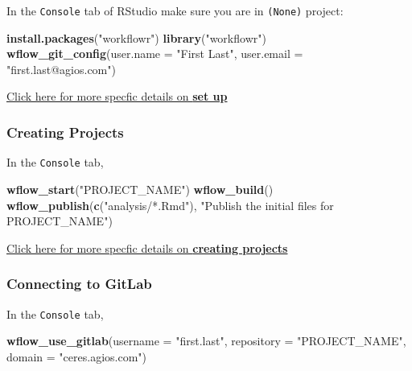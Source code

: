 \documentclass[openany]{book}
\newenvironment{Shaded}{\begin{snugshade}}{\end{snugshade}}
\newcommand{\DataTypeTok}[1]{\textcolor[rgb]{0.13,0.29,0.53}{#1}}
\newcommand{\KeywordTok}[1]{\textcolor[rgb]{0.13,0.29,0.53}{\textbf{#1}}}
\newcommand{\NormalTok}[1]{#1}
\newcommand{\StringTok}[1]{\textcolor[rgb]{0.31,0.60,0.02}{#1}}
\begin{document}
In the \texttt{Console} tab of RStudio make sure you are in \texttt{(None)} project:

\begin{Shaded}
\begin{Highlighting}[]
\KeywordTok{install.packages}\NormalTok{(}\StringTok{"workflowr"}\NormalTok{)}
\KeywordTok{library}\NormalTok{(}\StringTok{"workflowr"}\NormalTok{)}
\KeywordTok{wflow_git_config}\NormalTok{(}\DataTypeTok{user.name =} \StringTok{"First Last"}\NormalTok{, }\DataTypeTok{user.email =} \StringTok{"first.last@agios.com"}\NormalTok{)}
\end{Highlighting}
\end{Shaded}

\protect\hyperlink{installation}{Click here for more specfic details on \textbf{set up}}

\hypertarget{creating-projects}{%
\subsubsection{Creating Projects}\label{creating-projects}}

In the \texttt{Console} tab,

\begin{Shaded}
\begin{Highlighting}[]
\KeywordTok{wflow_start}\NormalTok{(}\StringTok{"PROJECT_NAME"}\NormalTok{)}
\KeywordTok{wflow_build}\NormalTok{()}
\KeywordTok{wflow_publish}\NormalTok{(}\KeywordTok{c}\NormalTok{(}\StringTok{"analysis/*.Rmd"}\NormalTok{), }\StringTok{"Publish the initial files for PROJECT_NAME"}\NormalTok{)}
\end{Highlighting}
\end{Shaded}

\protect\hyperlink{create-project}{Click here for more specfic details on \textbf{creating projects}}

\hypertarget{connecting-to-gitlab}{%
\subsubsection{Connecting to GitLab}\label{connecting-to-gitlab}}

In the \texttt{Console} tab,

\begin{Shaded}
\begin{Highlighting}[]
\KeywordTok{wflow_use_gitlab}\NormalTok{(}\DataTypeTok{username =} \StringTok{"first.last"}\NormalTok{, }\DataTypeTok{repository =} \StringTok{"PROJECT_NAME"}\NormalTok{, }\DataTypeTok{domain =} \StringTok{"ceres.agios.com"}\NormalTok{)}
\end{Highlighting}
\end{Shaded}
\end{document}
